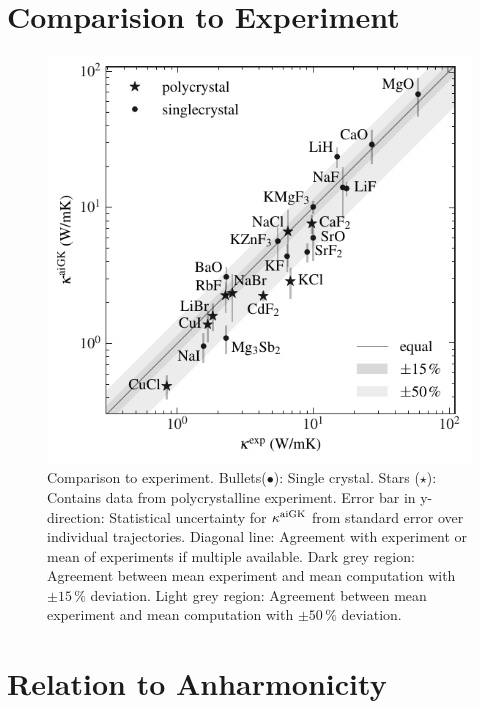 \section{Comparision to Experiment}

\begin{figure}
	\includegraphics[width=\textwidth]{./data/plots/kappa_vs_exp_trusted/kappa_vs_exp_corrected_annotated.pdf}
	\caption{Comparison to experiment. Bullets($\bullet$): Single crystal. Stars ($\star$): Contains data from polycrystalline experiment. Error bar in y-direction: Statistical uncertainty for $\kappa^{\rm aiGK}$ from standard error over individual trajectories. Diagonal line: Agreement with experiment or mean of experiments if multiple available. Dark grey region: Agreement between mean experiment and mean computation with $\pm 15\,\%$ deviation. Light grey region: Agreement between mean experiment and mean computation with $\pm 50\,\%$ deviation.}
	\label{fig:kappa_exp}
\end{figure}



\section{Relation to Anharmonicity}

